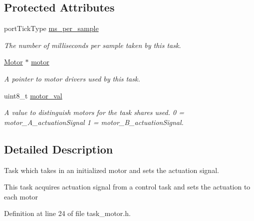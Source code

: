 \subsection*{Protected Attributes}
\begin{DoxyCompactItemize}
\item 
port\+Tick\+Type \hyperlink{classtask__motor_a06a73825a67eaf5a5a8e31152189932f}{ms\+\_\+per\+\_\+sample}\hypertarget{classtask__motor_a06a73825a67eaf5a5a8e31152189932f}{}\label{classtask__motor_a06a73825a67eaf5a5a8e31152189932f}

\begin{DoxyCompactList}\small\item\em The number of milliseconds per sample taken by this task. \end{DoxyCompactList}\item 
\hyperlink{classMotor}{Motor} $\ast$ \hyperlink{classtask__motor_a3c6c88561488febb3bbd71aec7ba1c8f}{motor}\hypertarget{classtask__motor_a3c6c88561488febb3bbd71aec7ba1c8f}{}\label{classtask__motor_a3c6c88561488febb3bbd71aec7ba1c8f}

\begin{DoxyCompactList}\small\item\em A pointer to motor drivers used by this task. \end{DoxyCompactList}\item 
uint8\+\_\+t \hyperlink{classtask__motor_a82f00436863da33b154ce88f1735c69e}{motor\+\_\+val}\hypertarget{classtask__motor_a82f00436863da33b154ce88f1735c69e}{}\label{classtask__motor_a82f00436863da33b154ce88f1735c69e}

\begin{DoxyCompactList}\small\item\em A value to distinguish motors for the task shares used. 0 = motor\+\_\+\+A\+\_\+actuation\+Signal 1 = motor\+\_\+\+B\+\_\+actuation\+Signal. \end{DoxyCompactList}\end{DoxyCompactItemize}


\subsection{Detailed Description}
Task which takes in an initialized motor and sets the actuation signal. 

This task acquires actuation signal from a control task and sets the actuation to each motor 

Definition at line 24 of file task\+\_\+motor.\+h.



